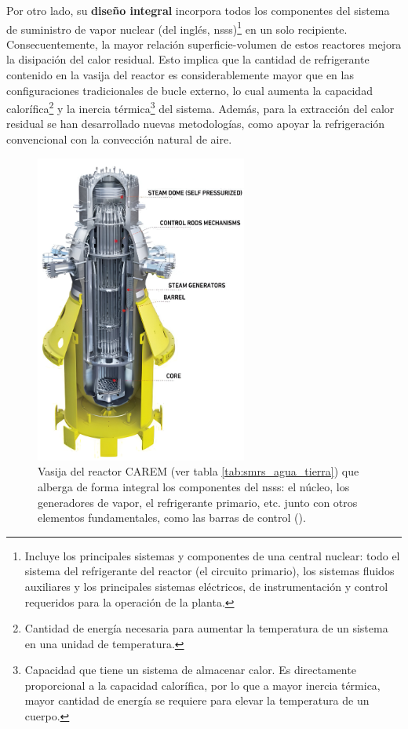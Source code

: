 Por otro lado, su \textbf{diseño integral} incorpora todos los componentes del \gls{sistema de suministro de vapor nuclear} (del inglés, \acrshort{nsss})\footnote{Incluye los principales sistemas y componentes de una central nuclear: todo el sistema del refrigerante del reactor (el circuito primario), los sistemas fluidos auxiliares y los principales sistemas eléctricos, de instrumentación y control requeridos para la operación de la planta.} en un solo recipiente. Consecuentemente, la mayor relación superficie-volumen de estos reactores mejora la disipación del calor residual. Esto implica que la cantidad de refrigerante contenido en la vasija del reactor es considerablemente mayor que en las configuraciones tradicionales de bucle externo, lo cual aumenta la capacidad calorífica\footnote{Cantidad de energía necesaria para aumentar la temperatura de un sistema en una unidad de temperatura.} y la inercia térmica\footnote{Capacidad que tiene un sistema de almacenar calor. Es directamente proporcional a la capacidad calorífica, por lo que a mayor inercia térmica, mayor cantidad de energía se requiere para elevar la temperatura de un cuerpo.} del sistema. Además, para la extracción del calor residual se han desarrollado nuevas metodologías, como apoyar la refrigeración convencional con la convección natural de aire.

\begin{figure}[h]
  \centering
  \includegraphics[width=0.62\textwidth]{content/figures/carem.jpeg}
  \caption{Vasija del reactor CAREM (ver tabla \ref{tab:smrs_agua_tierra}) que alberga de forma integral los componentes del \acrshort{nsss}: el núcleo, los generadores de vapor, el refrigerante primario, etc. junto con otros elementos fundamentales, como las barras de control (\cite{iaea_smr_booklet_2022}).}
  \label{fig:carem}
\end{figure}

